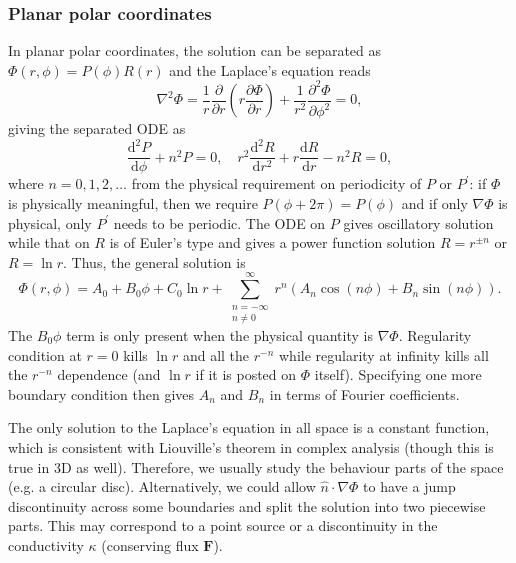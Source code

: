 \documentclass{article}
\begin{document}
\subsubsection{Planar polar coordinates}
In planar polar coordinates, the solution can be separated as $\Phi(r,\phi) = P(\phi) R(r)$ and the Laplace's equation reads 
\[
    \nabla ^{2} \Phi  = \frac{1}{r}\frac{\partial }{\partial r} \left( r \frac{\partial \Phi }{\partial r} \right) 
    + \frac{1}{r^{2} } \frac{\partial ^{2} \Phi }{\partial \phi ^{2} } = 0,
\]
giving the separated ODE as
\[
    \frac{\mathrm{d}^{2} P}{\mathrm{d}\phi } + n^{2} P = 0, \quad 
    r^{2} \frac{\mathrm{d}^{2} R}{\mathrm{d}r^{2} } + r \frac{\mathrm{d}R}{\mathrm{d}r} - n^{2} R = 0,
\]
where $n = 0, 1, 2, \ldots $ from the physical requirement on periodicity of $P$ or $P^\prime$: if $\Phi$ is physically meaningful, then we require $P(\phi + 2\pi ) = P(\phi)$ and if only $\nabla \Phi$ is physical, only $P^\prime$ needs to be periodic. The ODE on $P$ gives oscillatory solution while that on $R$ is of Euler's type and gives a power function solution $R = r^{\pm n}$ or $R = \ln{r}$. Thus, the general solution is 
\[
    \boxed{
    \Phi(r,\phi) = A_0 + B_0 \phi + C_0 \ln{r} + 
    \sum_{\substack{n=-\infty \\ n \neq 0}}^{\infty } r^n (A_n \cos(n \phi ) + B_n \sin(n \phi )).} 
\]
The $B_0 \phi$ term is only present when the physical quantity is $\nabla \Phi.$ Regularity condition at $r=0$ kills $\ln{r}$ and all the $r^{-n}$ while regularity at infinity kills all the $r^{-n}$ dependence (and $\ln{r}$ if it is posted on $\Phi$ itself). Specifying one more boundary condition then gives $A_n$ and $B_n$ in terms of Fourier coefficients. 

The only solution to the Laplace's equation in all space is a constant function, which is consistent with Liouville's theorem in complex analysis (though this is true in 3D as well). Therefore, we usually study the behaviour parts of the space (e.g. a circular disc). Alternatively, we could allow $\hat{n}\cdot \nabla \Phi$ to have a jump discontinuity across some boundaries and split the solution into two piecewise parts. This may correspond to a point source or a discontinuity in the conductivity $\kappa $ (conserving flux $\mathbf{F} $). 
\end{document}

